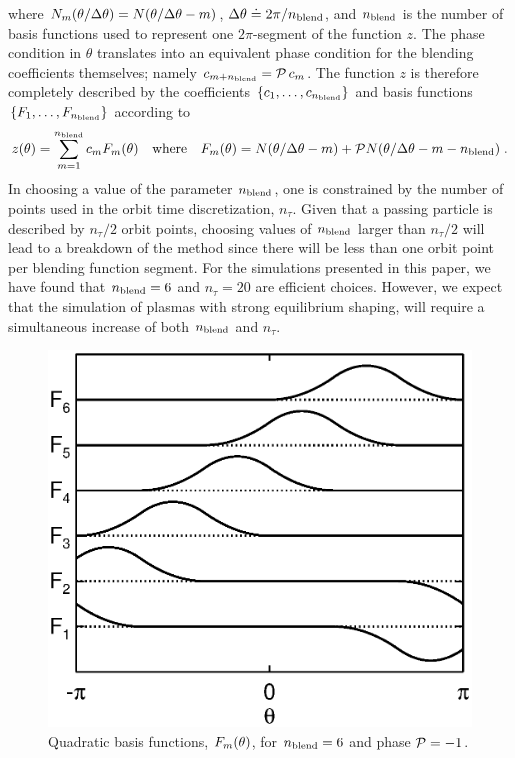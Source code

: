 \noindent
where $N_m(\theta/\Delta\theta) = N(\theta/\Delta\theta - m)$, 
$\Delta\theta \doteq 2\pi/{n_{\rm blend}}$, and ${n_{\rm blend}}$ is the number of basis 
functions used to represent one $2\pi$-segment of the 
function $z$.  The phase condition in $\theta$ translates into an 
equivalent phase condition for the blending coefficients 
themselves; namely 
$c_{m+{n_{\rm blend}}} = {\cal P} \, c_m$.  The function $z$ 
is therefore completely described by the coefficients 
$\left\{c_1, \ldots, c_{n_{\rm blend}}\right\}$ and basis functions 
$\left\{F_1, \ldots, F_{n_{\rm blend}}\right\}$ according to
%
\begin{equation}
z(\theta) = \sum_{m=1}^{n_{\rm blend}} c_m {F_m}(\theta)
\quad\hbox{where}\quad
{F_m}(\theta) = N(\theta/\Delta\theta-m) + {\cal P} N(\theta/\Delta\theta-m-{n_{\rm blend}}) \; .
\label{blendf}
\end{equation}
%
In choosing a value of the parameter ${n_{\rm blend}}$, 
one is constrained by the number of points used in the 
orbit time discretization, $n_\tau$.  Given that a passing 
particle is described by $n_\tau/2$ orbit points, choosing 
values of ${n_{\rm blend}}$ larger than $n_\tau/2$ will lead to a 
breakdown of the method since there will be less than 
one orbit point per blending function segment.  For the 
simulations presented in this paper, we have found that 
${n_{\rm blend}}=6$ and $n_\tau=20$ are efficient choices.  However, we 
expect that the simulation of plasmas with strong equilibrium 
shaping, will require a simultaneous increase of both 
${n_{\rm blend}}$ and $n_\tau$.  

\begin{figure}
\begin{center}
\includegraphics[scale=\largefig]{figures/blend_f.ps}
\end{center}
\caption{Quadratic basis functions, ${F_m}(\theta)$, for 
${n_{\rm blend}}=6$ and phase ${\cal P}=-1$.}
\label{fig.blendf}
\end{figure}

